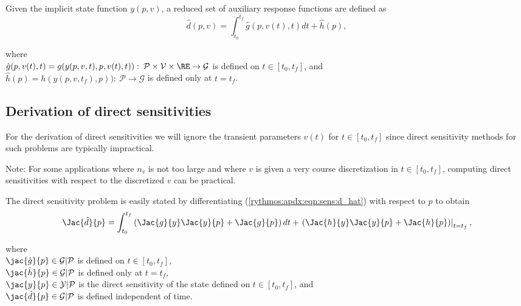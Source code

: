 \documentclass[pdf,ps2pdf,11pt]{SANDreport}
\begin{document}
Given the implicit state function $y(p,v)$, a reduced set of auxiliary response
functions are defined as
%
\begin{equation}
\hat{d}(p,v)
= \int_{t_0}^{t_f} \hat{g}(p,v(t),t) dt + \hat{h}(p),
\label{rythmos:apdx:eqn:sens:d_hat}
\end{equation}
\begin{tabbing}
\hspace{4ex}where\hspace{1ex}\= \\
\>	$\hat{g}(p,v(t),t) = g(y(p,v,t),p,v(t),t)) : \:
		\mathcal{P} \times \mathcal{V} \times \RE \rightarrow \mathcal{G}$ is defined on $t\in[t_0,t_f]$, and \\
\>	$\hat{h}(p) = h(y(p,v,t_f),p)) : \:
		\mathcal{P} \rightarrow \mathcal{G}$ is defined only at $t=t_f$.
\end{tabbing}

\subsection{Derivation of direct sensitivities}
\label{rythmos:app:direct-sens-derivation}

For the derivation of direct sensitivities we will ignore the
transient parameters $v(t)$ for $t\in[t_0,t_f]$ since direct
sensitivity methods for such problems are typically impractical.

Note: For some applications where $n_v$ is not too large and where
$v$ is given a very course discretization in $t\in[t_0,t_f]$,
computing direct sensitivities with respect to the discretized $v$ can
be practical.

The direct sensitivity problem is easily stated by differentiating
(\ref{rythmos:apdx:eqn:sens:d_hat}) with respect to $p$ to obtain
%
\begin{equation}
\Jac{\hat{d}}{p}
= \int_{t_0}^{t_f} \left( \Jac{g}{y} \Jac{y}{p} +  \Jac{g}{p} \right) dt
+ \left. \left(  \Jac{h}{y} \Jac{y}{p} + \Jac{h}{p} \right) \right|_{t=t_f},
\label{rythmos:apdx:eqn:sens:d_d_hat_d_p}
\end{equation}
\begin{tabbing}
\hspace{4ex}where\hspace{1ex}\= \\
\>	$\jac{\hat{g}}{p} \in \mathcal{G}|\mathcal{P}$ is defined on $t\in[t_0,t_f]$, \\
\>	$\jac{\hat{h}}{p} \in \mathcal{G}|\mathcal{P}$ is defined only at $t=t_f$, \\
\>	$\jac{y}{p} \in \mathcal{Y}|\mathcal{P}$ is the direct sensitivity of the state defined on $t\in[t_0,t_f]$, and \\
\>	$\jac{\hat{d}}{p} \in \mathcal{G}|\mathcal{P}$ is defined independent of time.
\end{tabbing}
\end{document}
